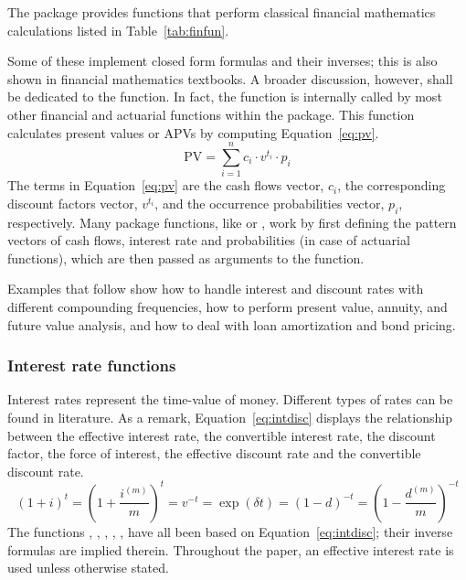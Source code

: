 \documentclass[nojss]{jss}
\begin{document}
The  package provides functions that perform
classical financial mathematics calculations listed in
Table~\ref{tab:finfun}.

Some of these implement closed form formulas and their inverses; this
is also shown in financial mathematics textbooks. A broader
discussion, however, shall be dedicated to the 
function. In fact, the  function is internally
called by most other financial and actuarial functions within the
 package. This function calculates present
values or APVs by computing Equation~\ref{eq:pv}.
%
\begin{equation}
\text{PV}=\sum\limits_{i = 1}^n {c_i\cdot v^{t_i}\cdot p_i} 
\label{eq:pv}
\end{equation}
%
The terms in Equation~\ref{eq:pv} are the cash flows vector, $c_i$,
the corresponding discount factors vector, $v^{t_i}$, and the
occurrence probabilities vector, $p_i$, respectively. Many
 package functions, like  or
, work by first defining the pattern vectors of cash
flows, interest rate and probabilities (in case of actuarial
functions), which are then passed as arguments to the
 function.

Examples that follow show how to handle interest and discount rates
with different compounding frequencies, how to perform present value,
annuity, and future value analysis, and how to deal with loan
amortization and bond pricing.



\subsubsection{Interest rate functions}\label{sss:subsubInterest}
Interest rates represent the time-value of money. Different
types of rates can be found in literature. As a remark,
Equation~\ref{eq:intdisc} displays the relationship between the effective interest
rate, the convertible interest rate, the discount factor, the force of interest, the effective
discount rate and the convertible discount rate.
%
\begin{equation}
\left( 1 + i \right)^t = \left( 1 + \frac{i^{\left( m \right)}}{m} \right)^t = v^{-t} =
\exp \left( \delta t \right) = \left( 1 - d \right)^{ - t} = 
\left( 1 - \frac{d^{\left( m \right)}}{m} \right)^{ - t}
\label{eq:intdisc}
\end{equation}
%
The functions , ,
, \linebreak
{}, ,
 have all been based on
Equation~\ref{eq:intdisc}; their inverse formulas are implied
therein. Throughout the paper, an effective interest rate is used
unless otherwise stated.
\end{document}
